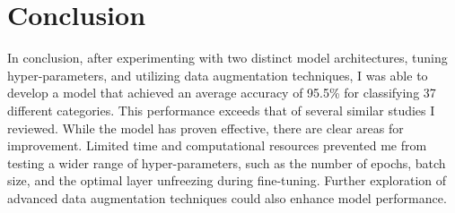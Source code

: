 \chapter{Conclusion}
\label{ch:reflection}
In conclusion, after experimenting with two distinct model architectures, tuning hyper-parameters, and utilizing data augmentation techniques, I was able to develop a model that achieved an average accuracy of 95.5\% for classifying 37 different categories. This performance exceeds that of several similar studies I reviewed. While the model has proven effective, there are clear areas for improvement. Limited time and computational resources prevented me from testing a wider range of hyper-parameters, such as the number of epochs, batch size, and the optimal layer unfreezing during fine-tuning. Further exploration of advanced data augmentation techniques could also enhance model performance.

